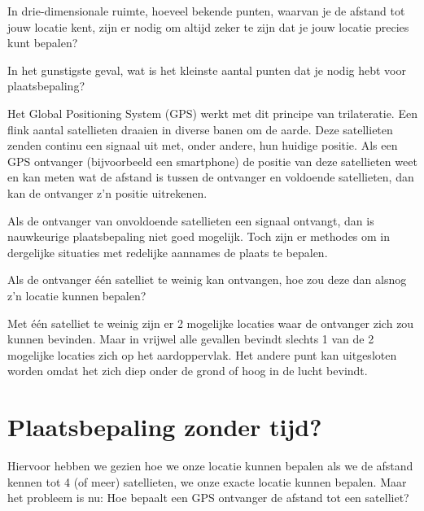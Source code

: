 \begin{opgave}
	\begin{subopgave}
		In drie-dimensionale ruimte, hoeveel bekende punten, waarvan je de afstand tot jouw locatie kent, zijn er nodig om altijd zeker te zijn dat je jouw locatie precies kunt bepalen? 
	\end{subopgave}
	\begin{subopgave}		
		In het gunstigste geval, wat is het kleinste aantal punten dat je nodig hebt voor plaatsbepaling?
	\end{subopgave}
\end{opgave}

Het Global Positioning System (GPS) werkt met dit principe van trilateratie. Een flink aantal satellieten draaien in diverse banen om de aarde. Deze satellieten zenden continu een signaal uit met, onder andere, hun huidige positie. Als een GPS ontvanger (bijvoorbeeld een smartphone) de positie van deze satellieten weet en kan meten wat de afstand is tussen de ontvanger en voldoende satellieten, dan kan de ontvanger z'n positie uitrekenen.

Als de ontvanger van onvoldoende satellieten een signaal ontvangt, dan is nauwkeurige plaatsbepaling niet goed mogelijk. Toch zijn er methodes om in dergelijke situaties met redelijke aannames de plaats te bepalen.

\begin{opgave}
	Als de ontvanger \'e\'en satelliet te weinig kan ontvangen, hoe zou deze dan alsnog z'n locatie kunnen bepalen?
	\begin{antwoord}
		Met \'e\'en satelliet te weinig zijn er 2 mogelijke locaties waar de ontvanger zich zou kunnen bevinden. Maar in vrijwel alle gevallen bevindt slechts 1 van de 2 mogelijke locaties zich op het aardoppervlak. Het andere punt kan uitgesloten worden omdat het zich diep onder de grond of hoog in de lucht bevindt.
	\end{antwoord}
\end{opgave}

\section{Plaatsbepaling zonder tijd?}

Hiervoor hebben we gezien hoe we onze locatie kunnen bepalen als we de afstand kennen tot 4 (of meer) satellieten, we onze exacte locatie kunnen bepalen. Maar het probleem is nu: Hoe bepaalt een GPS ontvanger de afstand tot een satelliet?

